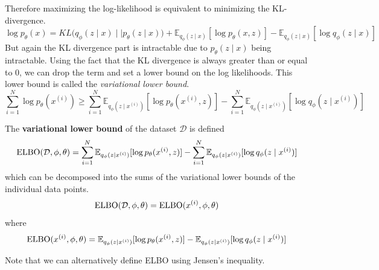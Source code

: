   Therefore maximizing the log-likelihood is equivalent to minimizing the KL-divergence. 
  \begin{equation}
    \log p_\theta (x) = KL \big( q_\phi (z \mid x) \mid\mid p_{\theta} (z \mid x) \big) + \mathbb{E}_{q_{\phi} (z \mid x)} [\log p_{\theta} (x, z)] - \mathbb{E}_{q_\phi(z \mid x)} [ \log q_{\phi} (z \mid x)]
  \end{equation}
  But again the KL divergence part is intractable due to $p_\theta (z \mid x)$ being intractable. Using the fact that the KL divergence is always greater than or equal to $0$, we can drop the term and set a lower bound on the log likelihoods. This lower bound is called the \textit{variational lower bound}.  
  \begin{equation}
    \sum_{i=1}^N \log p_{\theta} (x^{(i)}) \geq \sum_{i=1}^N \mathbb{E}_{q_\phi (z \mid x^{(i)})} [ \log p_{\theta} (x^{(i)}, z)] - \sum_{i=1}^N \mathbb{E}_{q_{\phi} (z \mid x^{(i)})} [ \log q_{\phi} (z \mid x^{(i)}) ]
  \end{equation} 

  \begin{definition}
    The \textbf{variational lower bound} of the dataset $\mathcal{D}$ is defined 
    \begin{equation}
      \elbo(\mathcal{D}, \phi, \theta) = \sum_{i=1}^N \mathbb{E}_{q_\phi (z \mid x^{(i)})} [ \log p_{\theta} (x^{(i)}, z)] - \sum_{i=1}^N \mathbb{E}_{q_{\phi} (z \mid x^{(i)})} [ \log q_{\phi} (z \mid x^{(i)})] 
    \end{equation}
    which can be decomposed into the sums of the variational lower bounds of the individual data points. 
    \begin{equation}
      \elbo(\mathcal{D}, \phi, \theta) = \elbo(x^{(i)}, \phi, \theta) 
    \end{equation}
    where 
    \begin{equation}
      \elbo(x^{(i)}, \phi, \theta) = \mathbb{E}_{q_\phi (z \mid x^{(i)})} [ \log p_{\theta} (x^{(i)}, z)] - \mathbb{E}_{q_{\phi} (z \mid x^{(i)})} [ \log q_{\phi} (z \mid x^{(i)})] 
    \end{equation}
  \end{definition}

  Note that we can alternatively define ELBO using Jensen's inequality. 

